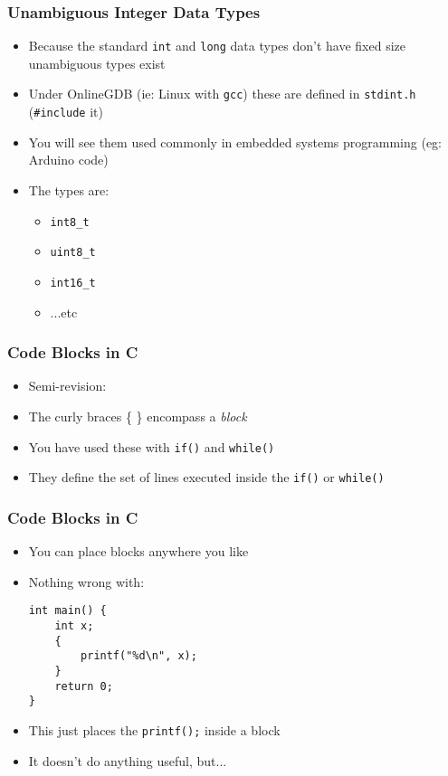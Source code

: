 \documentclass[14pt]{beamer}
\begin{document}
\begin{frame}
\frametitle{Unambiguous Integer Data Types}
\begin{itemize}
\item Because the standard \texttt{int} and \texttt{long} data types don't have fixed size unambiguous types exist
\item Under OnlineGDB (ie: Linux with \texttt{gcc}) these are defined in \texttt{stdint.h} (\texttt{\#include} it)
\item You will see them used commonly in embedded systems programming (eg: Arduino code)
\item The types are:
	\begin{itemize}
		\item \texttt{int8\_t}
		\item \texttt{uint8\_t}
		\item \texttt{int16\_t}
		\item ...etc
	\end{itemize}
\end{itemize}
\end{frame}

\begin{frame}[fragile]
\frametitle{Code Blocks in C}
\begin{itemize}
\item Semi-revision:
\item The curly braces \{ \} encompass a \textit{block}
\item You have used these with \texttt{if()} and \texttt{while()}
\item They define the set of lines executed inside the \texttt{if()} or \texttt{while()}

\end{itemize}
\end{frame}

\begin{frame}[fragile]
\frametitle{Code Blocks in C}
\begin{itemize}
\item You can place blocks anywhere you like
\item Nothing wrong with:
\begin{lstlisting}[style=CStyle]
int main() {
	int x;
	{
		printf("%d\n", x);
	}
	return 0;
}
\end{lstlisting}
\item This just places the \texttt{printf();} inside a block
\item It doesn't do anything useful, but...
\end{itemize}
\end{frame}
\end{document}
